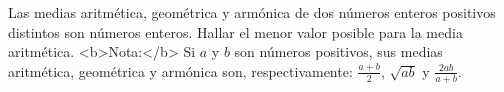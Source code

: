 Las medias aritmética, geométrica y armónica de dos números enteros positivos distintos son números enteros. Hallar el menor valor posible para la media aritmética. \newline 
<b>Nota:</b> Si $a$ y $b$ son números positivos, sus medias aritmética, geométrica y armónica son, respectivamente: $\frac{a+b}{2}$, $\sqrt{ab}$ y $\frac{2ab}{a+b}$.
